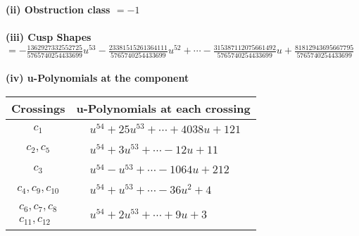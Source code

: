 \documentclass[1p]{elsarticle_modified}
\theoremstyle{definition}
\begin{document}
\flushleft \textbf{(ii) Obstruction class $= -1$}\\~\\
\flushleft \textbf{(iii) Cusp Shapes $= -\frac{1362927332552725}{5765740254433699} u^{53}-\frac{23381515261364111}{5765740254433699} u^{52}+\cdots-\frac{315387112075661492}{5765740254433699} u+\frac{81812943695667795}{5765740254433699}$}\\~\\
\newpage\renewcommand{\arraystretch}{1}
\flushleft \textbf{(iv) u-Polynomials at the component}\newline \\
\begin{tabular}{m{50pt}|m{274pt}}
Crossings & \hspace{64pt}u-Polynomials at each crossing \\
\hline $$\begin{aligned}c_{1}\end{aligned}$$&$\begin{aligned}
&u^{54}+25 u^{53}+\cdots+4038 u+121
\end{aligned}$\\
\hline $$\begin{aligned}c_{2},c_{5}\end{aligned}$$&$\begin{aligned}
&u^{54}+3 u^{53}+\cdots-12 u+11
\end{aligned}$\\
\hline $$\begin{aligned}c_{3}\end{aligned}$$&$\begin{aligned}
&u^{54}- u^{53}+\cdots-1064 u+212
\end{aligned}$\\
\hline $$\begin{aligned}c_{4},c_{9},c_{10}\end{aligned}$$&$\begin{aligned}
&u^{54}+u^{53}+\cdots-36 u^2+4
\end{aligned}$\\
\hline $$\begin{aligned}c_{6},c_{7},c_{8}\\c_{11},c_{12}\end{aligned}$$&$\begin{aligned}
&u^{54}+2 u^{53}+\cdots+9 u+3
\end{aligned}$\\
\hline
\end{tabular}\\~\\
\end{document}
